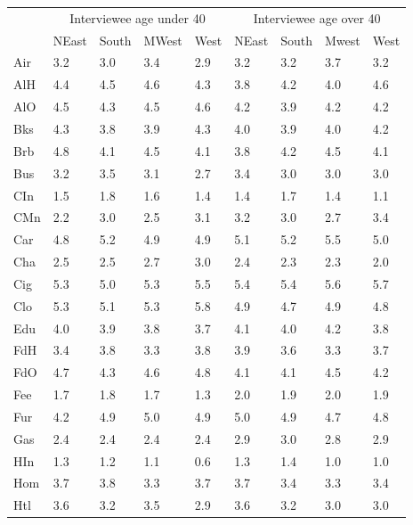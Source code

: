 \begin{table}[!ht]
    \centering
    {\footnotesize
    \begin{tabular}{lllllllll}
        \hline
        & \multicolumn{4}{c}{Interviewee age under 40} & \multicolumn{4}{c}{Interviewee age over 40}\\
            & NEast & South & MWest & West  & NEast & South & Mwest & West \\
        \hline\hline
        Air & 3.2 & 3.0 & 3.4 & 2.9 & 3.2 & 3.2 & 3.7 & 3.2\\
        AlH & 4.4 & 4.5 & 4.6 & 4.3 & 3.8 & 4.2 & 4.0 & 4.6\\
        AlO & 4.5 & 4.3 & 4.5 & 4.6 & 4.2 & 3.9 & 4.2 & 4.2\\
        Bks & 4.3 & 3.8 & 3.9 & 4.3 & 4.0 & 3.9 & 4.0 & 4.2\\
        Brb & 4.8 & 4.1 & 4.5 & 4.1 & 3.8 & 4.2 & 4.5 & 4.1\\
        Bus & 3.2 & 3.5 & 3.1 & 2.7 & 3.4 & 3.0 & 3.0 & 3.0\\
        CIn & 1.5 & 1.8 & 1.6 & 1.4 & 1.4 & 1.7 & 1.4 & 1.1\\
        CMn & 2.2 & 3.0 & 2.5 & 3.1 & 3.2 & 3.0 & 2.7 & 3.4\\
        Car & 4.8 & 5.2 & 4.9 & 4.9 & 5.1 & 5.2 & 5.5 & 5.0\\
        Cha & 2.5 & 2.5 & 2.7 & 3.0 & 2.4 & 2.3 & 2.3 & 2.0\\
        Cig & 5.3 & 5.0 & 5.3 & 5.5 & 5.4 & 5.4 & 5.6 & 5.7\\
        Clo & 5.3 & 5.1 & 5.3 & 5.8 & 4.9 & 4.7 & 4.9 & 4.8\\
        Edu & 4.0 & 3.9 & 3.8 & 3.7 & 4.1 & 4.0 & 4.2 & 3.8\\
        FdH & 3.4 & 3.8 & 3.3 & 3.8 & 3.9 & 3.6 & 3.3 & 3.7\\
        FdO & 4.7 & 4.3 & 4.6 & 4.8 & 4.1 & 4.1 & 4.5 & 4.2\\
        Fee & 1.7 & 1.8 & 1.7 & 1.3 & 2.0 & 1.9 & 2.0 & 1.9\\
        Fur & 4.2 & 4.9 & 5.0 & 4.9 & 5.0 & 4.9 & 4.7 & 4.8\\
        Gas & 2.4 & 2.4 & 2.4 & 2.4 & 2.9 & 3.0 & 2.8 & 2.9\\
        HIn & 1.3 & 1.2 & 1.1 & 0.6 & 1.3 & 1.4 & 1.0 & 1.0\\
        Hom & 3.7 & 3.8 & 3.3 & 3.7 & 3.7 & 3.4 & 3.3 & 3.4\\
        Htl & 3.6 & 3.2 & 3.5 & 2.9 & 3.6 & 3.2 & 3.0 & 3.0\\

\end{tabular}}
\end{table}
